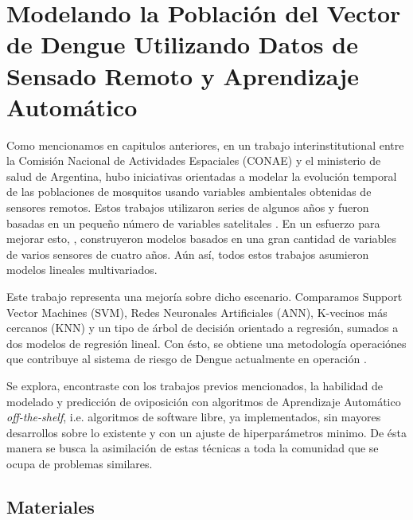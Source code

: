 


\justifying
\chapter{Modelando la Población del Vector de Dengue Utilizando Datos de Sensado Remoto y Aprendizaje Automático}

  \par Como mencionamos en capitulos anteriores, en un trabajo interinstitutional entre
    la Comisión Nacional de Actividades Espaciales (CONAE) y el ministerio de salud
    de Argentina, hubo iniciativas orientadas a modelar la evolución temporal de
    las poblaciones de mosquitos usando variables ambientales obtenidas de
    sensores remotos. Estos trabajos utilizaron series de algunos años y fueron
    basadas en un pequeño número de variables satelitales \cite{ndwi_erffectiveness, modis_data}.
    En un esfuerzo para mejorar esto, \cite{temporal_modeling}, construyeron modelos
    basados en una gran cantidad de variables de varios sensores de cuatro años.
    Aún así, todos estos trabajos asumieron modelos lineales multivariados.

  \par Este trabajo representa una mejoría sobre dicho escenario. Comparamos
    Support Vector Machines (SVM), Redes Neuronales Artificiales (ANN),
    K-vecinos más cercanos (KNN) y un tipo de árbol de decisión orientado a
    regresión, sumados a dos modelos de regresión lineal. Con ésto, se
    obtiene una metodología operaciónes que contribuye al sistema de riesgo
    de Dengue actualmente en operación \cite{porcasi_operative, analisis_cordoba}.

  \par Se explora, encontraste con los trabajos previos mencionados, la habilidad
    de modelado y predicción de oviposición con algoritmos de Aprendizaje
    Automático \textit{off-the-shelf}, i.e. algoritmos de software libre, ya
    implementados, sin mayores desarrollos sobre lo existente y con un ajuste de
    hiperparámetros minimo. De ésta manera se busca la asimilación de estas
    técnicas a toda la comunidad que se ocupa de problemas similares.


\section{Materiales}

